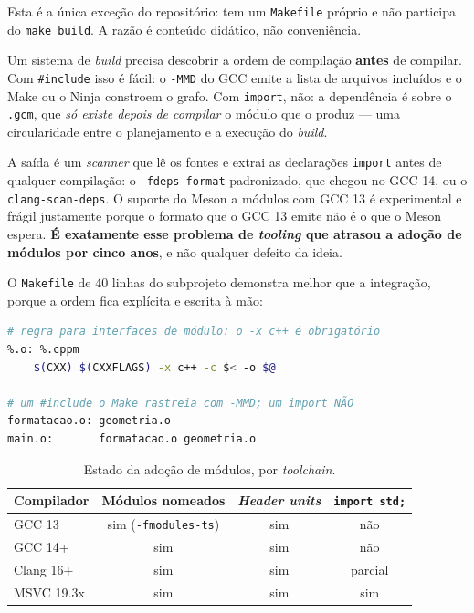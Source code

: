 Esta é a única exceção do repositório:  tem um
\texttt{Makefile} próprio e não participa do \texttt{make build}. A razão é
conteúdo didático, não conveniência.

\begin{porque}
Um sistema de \emph{build} precisa descobrir a ordem de compilação
\textbf{antes} de compilar. Com \texttt{\#include} isso é fácil: o
\texttt{-MMD} do GCC emite a lista de arquivos incluídos e o Make ou o Ninja
constroem o grafo. Com \texttt{import}, não: a dependência é sobre o
\texttt{.gcm}, que \emph{só existe depois de compilar} o módulo que o produz ---
uma circularidade entre o planejamento e a execução do \emph{build}.

A saída é um \emph{scanner} que lê os fontes e extrai as declarações
\texttt{import} antes de qualquer compilação: o \texttt{-fdeps-format}
padronizado, que chegou no GCC 14, ou o \texttt{clang-scan-deps}. O suporte do
Meson a módulos com GCC 13 é experimental e frágil justamente porque o formato
que o GCC 13 emite não é o que o Meson espera. \textbf{É exatamente esse
problema de \emph{tooling} que atrasou a adoção de módulos por cinco anos}, e
não qualquer defeito da ideia.
\end{porque}

O \texttt{Makefile} de 40 linhas do subprojeto demonstra melhor que a
integração, porque a ordem fica explícita e escrita à mão:

\begin{lstlisting}[style=bt, language=bash,
    caption={As dependências que o Make não descobre sozinho, em
             \texttt{src/modules/Makefile}.}]
# regra para interfaces de módulo: o -x c++ é obrigatório
%.o: %.cppm
	$(CXX) $(CXXFLAGS) -x c++ -c $< -o $@

# um #include o Make rastreia com -MMD; um import NÃO
formatacao.o: geometria.o
main.o:       formatacao.o geometria.o
\end{lstlisting}

\begin{table}[htbp]
\centering
\caption{Estado da adoção de módulos, por \emph{toolchain}.}
\label{tab:adocao-modulos}
\footnotesize
\begin{tabular}{@{}lccc@{}}
\toprule
\textbf{Compilador} & \textbf{Módulos nomeados} & \textbf{\emph{Header units}} & \texttt{import std;} \\
\midrule
GCC 13      & sim (\texttt{-fmodules-ts}) & sim & não \\
GCC 14+     & sim                         & sim & não \\
Clang 16+   & sim                         & sim & parcial \\
MSVC 19.3x  & sim                         & sim & sim \\
\bottomrule
\end{tabular}
\end{table}

